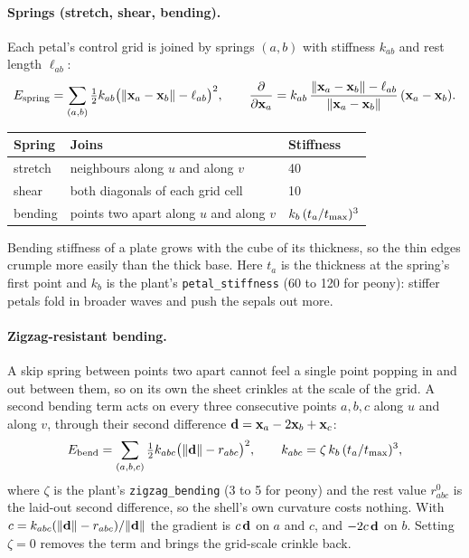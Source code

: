 \paragraph{Springs (stretch, shear, bending).} Each petal's control grid is
joined by springs $(a,b)$ with stiffness $k_{ab}$ and rest length $\ell_{ab}$:
\[
  E_{\mathrm{spring}} = \sum_{(a,b)} \tfrac12 k_{ab}\bigl(\lVert\mathbf{x}_a - \mathbf{x}_b\rVert - \ell_{ab}\bigr)^2,
  \qquad
  \frac{\partial}{\partial \mathbf{x}_a} = k_{ab}\,\frac{\lVert\mathbf{x}_a - \mathbf{x}_b\rVert - \ell_{ab}}{\lVert\mathbf{x}_a - \mathbf{x}_b\rVert}\,(\mathbf{x}_a - \mathbf{x}_b).
\]
\begin{center}\small
\begin{tabular}{@{}lll@{}}
\toprule
Spring & Joins & Stiffness \\
\midrule
stretch & neighbours along $u$ and along $v$ & 40 \\
shear & both diagonals of each grid cell & 10 \\
bending & points two apart along $u$ and along $v$ & $k_b\,(t_a/t_{\max})^3$ \\
\bottomrule
\end{tabular}
\end{center}
Bending stiffness of a plate grows with the cube of its thickness, so the thin
edges crumple more easily than the thick base. Here $t_a$ is the thickness at
the spring's first point and $k_b$ is the plant's \texttt{petal\_stiffness}
(60 to 120 for peony): stiffer petals fold in broader waves and push the
sepals out more.

\paragraph{Zigzag-resistant bending.} A skip spring between points two apart
cannot feel a single point popping in and out between them, so on its own the
sheet crinkles at the scale of the grid. A second bending term acts on every
three consecutive points $a,b,c$ along $u$ and along $v$, through their second
difference $\mathbf{d} = \mathbf{x}_a - 2\mathbf{x}_b + \mathbf{x}_c$:
\[
  E_{\mathrm{bend}} = \sum_{(a,b,c)} \tfrac12 k_{abc}\bigl(\lVert\mathbf{d}\rVert - r_{abc}\bigr)^2,
  \qquad k_{abc} = \zeta\,k_b\,(t_a/t_{\max})^3,
\]
where $\zeta$ is the plant's \texttt{zigzag\_bending} (3 to 5 for peony) and the
rest value $r^0_{abc}$ is the laid-out second difference, so the shell's own
curvature costs nothing. With $c = k_{abc}(\lVert\mathbf{d}\rVert - r_{abc})/\lVert\mathbf{d}\rVert$
the gradient is $c\,\mathbf{d}$ on $a$ and $c$, and $-2c\,\mathbf{d}$ on $b$. Setting
$\zeta = 0$ removes the term and brings the grid-scale crinkle back.

